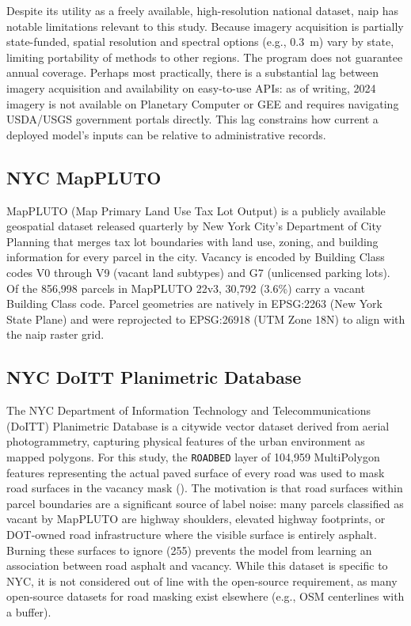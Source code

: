 Despite its utility as a freely available, high-resolution national dataset, \acrshort{naip} has notable limitations relevant to this study. Because imagery acquisition is partially state-funded, spatial resolution and spectral options (e.g., 0.3~m) vary by state, limiting portability of methods to other regions. The program does not guarantee annual coverage. Perhaps most practically, there is a substantial lag between imagery acquisition and availability on easy-to-use APIs: as of writing, 2024 imagery is not available on Planetary Computer or GEE and requires navigating USDA/USGS government portals directly. This lag constrains how current a deployed model's inputs can be relative to administrative records.

\subsection{NYC MapPLUTO}
\label{sec:mappluto}

MapPLUTO (Map Primary Land Use Tax Lot Output) is a publicly available geospatial dataset released quarterly by New York City's Department of City Planning that merges tax lot boundaries with land use, zoning, and building information for every parcel in the city. Vacancy is encoded by Building Class codes V0 through V9 (vacant land subtypes) and G7 (unlicensed parking lots). Of the 856,998 parcels in MapPLUTO 22v3, 30,792 (3.6\%) carry a vacant Building Class code. Parcel geometries are natively in EPSG:2263 (New York State Plane) and were reprojected to EPSG:26918 (UTM Zone 18N) to align with the \acrshort{naip} raster grid.

\subsection{NYC DoITT Planimetric Database}
\label{sec:doitt}

The NYC Department of Information Technology and Telecommunications (DoITT) Planimetric Database is a citywide vector dataset derived from aerial photogrammetry, capturing physical features of the urban environment as mapped polygons. For this study, the \texttt{ROADBED} layer of 104,959 MultiPolygon features representing the actual paved surface of every road was used to mask road surfaces in the vacancy mask (). The motivation is that road surfaces within parcel boundaries are a significant source of label noise: many parcels classified as vacant by MapPLUTO are highway shoulders, elevated highway footprints, or DOT-owned road infrastructure where the visible surface is entirely asphalt. Burning these surfaces to ignore (255) prevents the model from learning an association between road asphalt and vacancy. While this dataset is specific to NYC, it is not considered out of line with the open-source requirement, as many open-source datasets for road masking exist elsewhere (e.g., OSM centerlines with a buffer).

